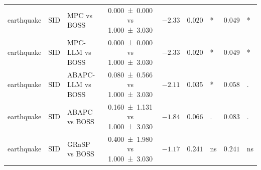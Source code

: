 \begin{table}[t]
{\begin{tabular}{ll l|c|r|rl|rl}
    earthquake & SID & MPC vs BOSS & \num{0.000 +- 0.000} vs \num{1.000 +- 3.030} & $-2.33$ & $0.020$ & \!\!\!* & $0.049$ & \!\!\!* \\
    earthquake & SID & MPC-LLM vs BOSS & \num{0.000 +- 0.000} vs \num{1.000 +- 3.030} & $-2.33$ & $0.020$ & \!\!\!* & $0.049$ & \!\!\!* \\
    earthquake & SID & ABAPC-LLM vs BOSS & \num{0.080 +- 0.566} vs \num{1.000 +- 3.030} & $-2.11$ & $0.035$ & \!\!\!* & $0.058$ & \!\!\!. \\
    earthquake & SID & ABAPC vs BOSS & \num{0.160 +- 1.131} vs \num{1.000 +- 3.030} & $-1.84$ & $0.066$ & \!\!\!. & $0.083$ & \!\!\!. \\
    earthquake & SID & GRaSP vs BOSS & \num{0.400 +- 1.980} vs \num{1.000 +- 3.030} & $-1.17$ & $0.241$ & \!\!\!ns & $0.241$ & \!\!\!ns \\
    \bottomrule
    \end{tabular}
    }
\end{table}
